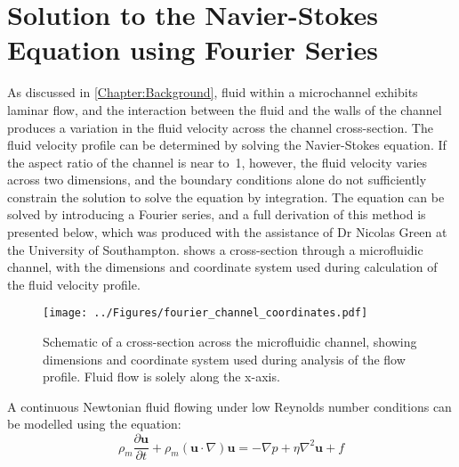 \chapter{Solution to the Navier-Stokes Equation using Fourier Series}
 \label{Chapter:derivation_of_HD_flow_profile_Fourier}

As discussed in \cref{Chapter:Background}, fluid within a microchannel exhibits laminar flow, and the interaction between the fluid and the walls of the channel produces a variation in the fluid velocity across the channel cross-section. The fluid velocity profile can be determined by solving the Navier-Stokes equation. If the aspect ratio of the channel is near to~1, however, the fluid velocity varies across two dimensions, and the boundary conditions alone do not sufficiently constrain the solution to solve the equation by integration. The equation can be solved by introducing a Fourier series, and a full derivation of this method is presented below, which was produced with the assistance of Dr Nicolas Green at the University of Southampton.  shows a cross-section through a microfluidic channel, with the dimensions and coordinate system used during calculation of the fluid velocity profile.

\vspace{7.5mm}

\begin{figure}[h!]
	\centering
		\texttt{[image: ../Figures/fourier\_channel\_coordinates.pdf]}
	\caption[Schematic of the dimensions and coordinate system on a cross-section across the microfluidic channel.]{Schematic of a cross-section across the microfluidic channel, showing dimensions and coordinate system used during analysis of the flow profile. Fluid flow is solely along the x-axis.}
	\label{fig:fourier_channel_coordinates}
\end{figure}

\pagebreak[4]

A continuous Newtonian fluid flowing under low Reynolds number conditions can be modelled using the equation: \nopagebreak[4]
\begin{equation}
 \rho_{m} \frac{\partial \mathbf{u}}{\partial t} + \rho_{m} (\mathbf{u} \cdot \nabla)\mathbf{u} = -\nabla p + \eta \nabla^{2}\mathbf{u} + f
\label{eqn:1}
\end{equation}

